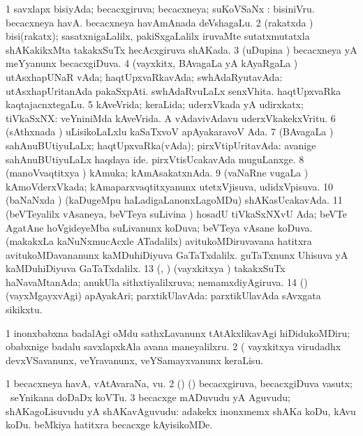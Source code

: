 \bentry
{} 
\gl{\gu}
\expl{}
\bmng
\bnum
\num{1} savxlapx bisiyAda; becacxgiruva; becacxneya; suKoVSaNx :  bisiniVru.  becacxneya havA.  becacxneya havAmAnada deVshagaLu. 
\num{2} (rakatxda \vi) bisi(rakatx); sasatxnigaLalilx, pakiSxgaLalilx iruvaMte sutatxmutatxla shAKakikxMta takakxSuTx hecAcxgiruva shAKada. 
\num{3} (uDupina \vi) becacxneya yA meYyanunx becacxgiDuva. 
\num{4} (vayxkitx, BAvagaLa yA kAyaRgaLa \vi) utAsxhapUNaR vAda; haqtUpxvaRkavAda; swhAdaRyutavAda:  utAsxhapUritanAda pakaSxpAti.  swhAdaRvuLaLx senxVhita.  haqtUpxvaRka kaqtajacnxtegaLu. 
\num{5} kAveVrida; keraLida; uderxVkada yA udirxkatx; tiVkaSxNX:  veYniniMda kAveVrida.  A vAdavivAdavu uderxVkakekxVritu. 
\num{6} (sAthxnada \vi) uLisikoLaLxlu kaSaTxvoV apAyakaravoV Ada. 
\num{7} (BAvagaLa \vi) sahAnuBUtiyuLaLx; haqtUpxvaRka(vAda); pirxVtipUritavAda:  avanige sahAnuBUtiyuLaLx haqdaya ide.  pirxVtisUcakavAda muguLanxge. 
\num{8} (manoVvaqtitxya \vi) kAmuka; kAmAsakatxnAda. 
\num{9} (vaNaRne \mo vugaLa \vi) kAmoVderxVkada; kAmaparxvaqtitxyanunx utetxVjisuva, udidxVpisuva. 
\num{10} (baNaNxda \vi) (kaDugeMpu haLadigaLanonxLagoMDu) shAKasUcakavAda. 
\num{11} (beVTeyalilx vAsaneya, beVTeya suLivina \vi) hosadU tiVkaSxNXvU Ada; beVTe AgatAne hoVgideyeMba suLivanunx koDuva; beVTeya vAsane koDuva. 
\banum
{} (makakxLa kaNuNxmucAcxle ATadalilx) avitukoMDiruvavana hatitxra avitukoMDavananunx kaMDuhiDiyuva GaTaTxdalilx. 
 guTaTxnunx Uhisuva yA kaMDuhiDiyuva GaTaTxdalilx. 
\eanum
\numie
\num{13} (\pArxparx, \AmA) (vayxkitxya \vi) takakxSuTx haNavaMtanAda; anukUla sithxtiyalilxruva; nemamxdiyAgiruva. 
\num{14} (\AmA) (vayxMgayxvAgi) apAyakAri; parxtikUlavAda:  parxtikUlavAda sAvxgata sikikxtu. 
\enum
\emng

\noindent 
\gl{\pagu}
\expl{}
\bmng
\bnum
\num{1}  inonxbabxna badalAgi oMdu sathxLavanunx tAtAkxlikavAgi hiDidukoMDiru; obabxnige badalu savxlapxkAla avana maneyalilxru. 
\num{2}  (  vayxkitxya virudadhx devxVSavanunx, veYravanunx, veYSamayxvanunx keraLisu. 
\enum
\emng
\eentry

\bentry
{} 
\gl{\nA}
\expl{}
\bmng
\bnum
\num{1} becacxneya havA, vAtAvaraNa, \mo vu. 
\num{2} (\birx) (\pArxparx) becacxgiruva, becacxgiDuva vasutx; \kanmu\ seYnikana doDaDx koVTu. 
\num{3} becacxge mADuvudu yA Aguvudu; shAKagoLisuvudu yA shAKavAguvudu:  adakekx inonxmemx shAKa koDu, kAvu koDu.  beMkiya hatitxra becacxge kAyisikoMDe. 
\enum
\emng
\eentry

